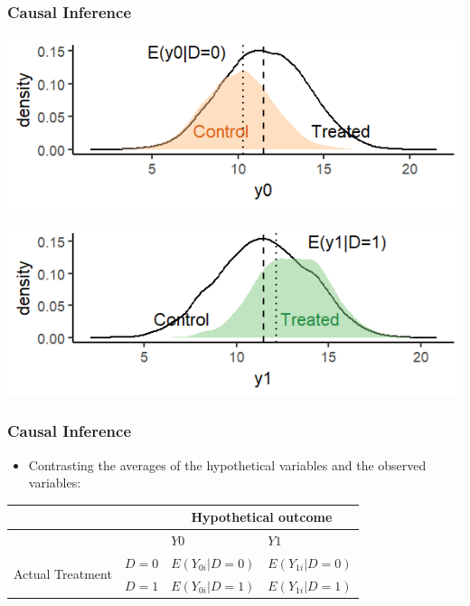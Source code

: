 \documentclass[xcolor=x11names,compress]{beamer}\usepackage[]{graphicx}\usepackage[]{color}
\makeatletter
\def\maxwidth{ %
  \ifdim\Gin@nat@width>\linewidth
    \linewidth
  \else
    \Gin@nat@width
  \fi
}
\newenvironment{knitrout}{}{} %
\renewcommand{\(}{\begin{columns}}
\renewcommand{\)}{\end{columns}}
\newcommand{\<}[1]{\begin{column}{#1}}
\renewcommand{\>}{\end{column}}
\makeatother
\begin{document}
\begin{frame}
\frametitle{Causal Inference}
\begin{knitrout}
\color{fgcolor}
\includegraphics[width=\maxwidth]{figure/OVB1d-1} 

\end{knitrout}

\begin{knitrout}
\color{fgcolor}
\includegraphics[width=\maxwidth]{figure/OVB2d-1} 

\end{knitrout}
\end{frame}

\begin{frame}
\frametitle{Causal Inference}
\begin{itemize}
\item Contrasting the averages of the hypothetical variables and the observed variables:
\end{itemize}
\begin{table}[htbp]
  \centering
    \begin{tabular}{|c|l|l|l|}
    \hline
          &       & \multicolumn{2}{c|}{Hypothetical outcome} \bigstrut\\
    \hline
          &       & $Y0$    & $Y1$ \bigstrut\\
    \hline
    \multirow{2}[4]{*}{Actual Treatment} & $D=0$   & $E(Y_{0i}|D=0)$ & $E(Y_{1i}|D=0)$ \bigstrut\\
\cline{2-4}          & $D=1$   & $E(Y_{0i}|D=1)$ & $E(Y_{1i}|D=1)$ \bigstrut\\
    \hline
    \end{tabular}%
  \label{tab:addlabel}%
\end{table}%

\end{frame}
\end{document}
